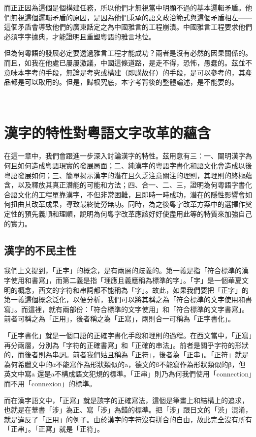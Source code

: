 \documentclass[a5paper, 12pt, openany]{book} %
\begin{document}
而正正因為這個是個構建任務，所以他們才無視當中明顯不過的基本邏輯矛盾。他們無視這個邏輯矛盾的原因，是因為他們秉承的語文政治範式與這個矛盾相左——這個矛盾會導致他們的廣東話定之為中國雅言的工程崩潰。中國雅言工程要求他們必須字字據典，才能證明且重塑粵語的雅言地位。

但為何粵語的發展必定要透過雅言工程才能成功？兩者是沒有必然的因果關係的。而且，如我在他處已屢屢激議，中國這條道路，是走不得，恐怖，愚蠢的。茲並不意味本字考的手段，無論是考究或構建（即講故仔）的手段，是可以參考的，其產品都是可以取用的。但是，歸根究底，本字考背後的整體論述，是不能要的。

 
\chapter{漢字的特性對粵語文字改革的蘊含}

在這一章中，我們會跟進一步深入討論漢字的特性。茲用意有三：一、闡明漢字為何且如何造成粵語現實的發展局面；二、純漢字的粵語字書化和語文化會造成以後粵語發展如何；三、簡單揭示漢字的潛在且久乏注意關注的理則，其理則的終極蘊含，以及釋放其真正潛能的可能和方法；四、合一、二、三，證明為何粵語字書化合語文化的工程單靠漢字，不但非常困難，且即時一時成功，潛在的隱性影響會如何扭曲其改革成果，導致最終徒勞無功。同時，為之後粵字改革方案中的選擇作奠定性的預先義順和理順，說明為何粵字改革應該好好使盡用此等的特質來加強自己的實力。

\section{漢字的不民主性}

我們上文提到，「正字」的概念，是有兩層的歧義的。第一義是指「符合標準的漢字使用和書寫」，而第二義是指「理應且義應稱為標準的字」。「字」是一個華夏文明的概念，西文的字符和串詞都不能稱為「字」。故此，如果我們要把「正字」的第一義這個概念泛化，以便分析，我們可以將其稱之為「符合標準的文字使用和書寫」。而這裡，就有兩部份：「符合標準的文字使用」和「符合標準的文字書寫」。前者可稱之為「正用」，後者稱之為「正寫」，兩則合一可稱為「正字書化」。

「正字書化」就是一個口語的正確字書化手段和理則的過程。在西文當中，「正寫」再分兩層，分別為「字符的正確書寫」和「正確的串法」。前者是關乎字符的形狀的，而後者則為串詞。前者我們姑且稱為「正符」，後者為「正串」。「正符」就是為何希臘文中的α不能寫作為形狀類似的a，德文的ß不能寫作為形狀類似的β，但英文中寫a 還是a不構成語文犯規的標準。「正串」則乃為何我們使用「connection」而不用「connexion」的標準。

而在漢字語文中，「正寫」就是該字的正確寫法，這個是筆畫上和結構上的追求，也就是在華書「涉」為正、寫「渉」為錯的標準。把「涉」跟日文的「渋」混淆，就是違反了「正用」的例子。由於漢字的字符沒有拼合的自由，故此完全沒有所有「正串」。「正寫」就是「正符」。
\end{document}
